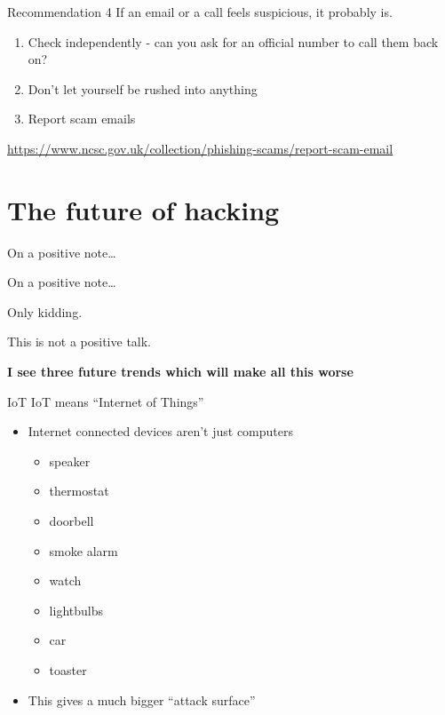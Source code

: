 \documentclass[xcolor=table]{beamer}
\begin{document}
\begin{frame}{Recommendation 4}
	If an email or a call feels suspicious, it probably is.

	\begin{enumerate}
		\item Check independently - can you ask for an official number to call them back on?
		\item Don't let yourself be rushed into anything
		\item Report scam emails
	\end{enumerate}
	\url{https://www.ncsc.gov.uk/collection/phishing-scams/report-scam-email}
	\end{frame}


\section{The future of hacking}
\begin{frame}{On a positive note\ldots}
\end{frame}
\begin{frame}{On a positive note\ldots}

Only kidding. 


	\vspace{0.5em}

	This is not a positive talk.

	\vspace{0.5em}

	\textbf{I see three future trends which will make all this worse}

\end{frame}
\begin{frame}{IoT}
	IoT means ``Internet of Things''
	\begin{itemize}
		\item Internet connected devices aren't just computers
			\begin{itemize}
				\item speaker
				\item thermostat
				\item doorbell
				\item smoke alarm
				\item watch
				\item lightbulbs
				\item car
				\item toaster
			\end{itemize}
		\item This gives a much bigger ``attack surface''
	\end{itemize}

\end{frame}
\end{document}
